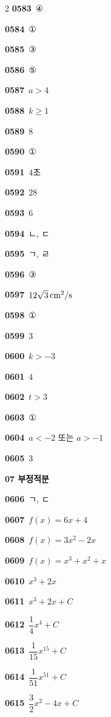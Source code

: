 \documentclass[10pt,a4paper]{article}
\begin{document}
\begin{multicols}{2}
\noindent\textbf{0583}\ ④\par
\noindent\textbf{0584}\ ①\par
\noindent\textbf{0585}\ ③\par
\noindent\textbf{0586}\ ⑤\par
\noindent\textbf{0587}\ $a>4$\par
\noindent\textbf{0588}\ $k\ge 1$\par
\noindent\textbf{0589}\ $8$\par
\noindent\textbf{0590}\ ①\par
\noindent\textbf{0591}\ $4$초\par
\noindent\textbf{0592}\ $28$\par
\noindent\textbf{0593}\ $6$\par
\noindent\textbf{0594}\ ㄴ, ㄷ\par
\noindent\textbf{0595}\ ㄱ, ㄹ\par
\noindent\textbf{0596}\ ③\par
\noindent\textbf{0597}\ $12\sqrt{3}\mkern3mu \mathrm{cm}^2/\mathrm{s}$\par
\noindent\textbf{0598}\ ①\par
\noindent\textbf{0599}\ $3$\par
\noindent\textbf{0600}\ $k>-3$\par
\noindent\textbf{0601}\ $4$\par
\noindent\textbf{0602}\ $t>3$\par
\noindent\textbf{0603}\ ①\par
\noindent\textbf{0604}\ $a<-2$ 또는 $a>-1$\par
\noindent\textbf{0605}\ $3$\par
\noindent\textbf{07 부정적분}\par\smallskip
\noindent\textbf{0606}\ ㄱ, ㄷ\par
\noindent\textbf{0607}\ $f(x)=6x+4$\par
\noindent\textbf{0608}\ $f(x)=3x^2-2x$\par
\noindent\textbf{0609}\ $f(x)=x^3+x^2+x$\par
\noindent\textbf{0610}\ $x^3+2x$\par
\noindent\textbf{0611}\ $x^3+2x+C$\par
\noindent\textbf{0612}\ $\dfrac{1}{4}x^4+C$\par
\noindent\textbf{0613}\ $\dfrac{1}{15}x^{15}+C$\par
\noindent\textbf{0614}\ $\dfrac{1}{51}x^{51}+C$\par
\noindent\textbf{0615}\ $\dfrac{3}{2}x^2-4x+C$\par

\end{multicols}
\end{document}
